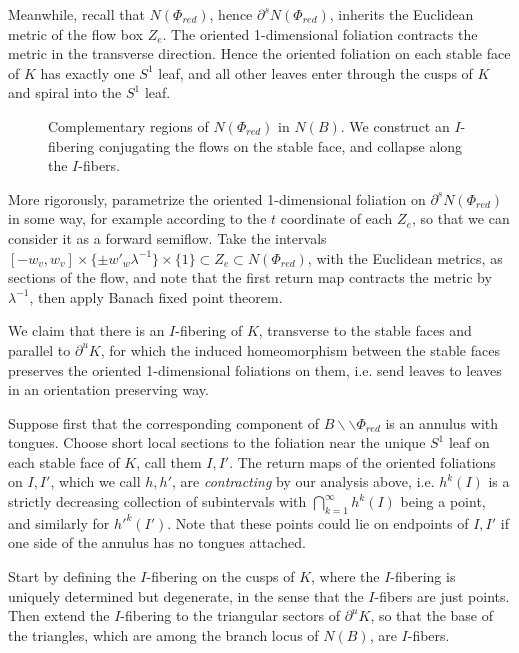 \documentclass[12pt]{amsart}
\theoremstyle{definition}
\numberwithin{equation}{section}
\begin{document}
Meanwhile, recall that $N(\Phi_{red})$, hence $\partial^s N(\Phi_{red})$, inherits the Euclidean metric of the flow box $Z_e$. The oriented 1-dimensional foliation contracts the metric in the transverse direction. Hence the oriented foliation on each stable face of $K$ has exactly one $S^1$ leaf, and all other leaves enter through the cusps of $K$ and spiral into the $S^1$ leaf. 

\begin{figure}
    \centering
    \resizebox{!}{8cm}{}
    \caption{Complementary regions of $N(\Phi_{red})$ in $N(B)$. We construct an $I$-fibering conjugating the flows on the stable face, and collapse along the $I$-fibers.}
    \label{fig:stableglue1}
\end{figure}

More rigorously, parametrize the oriented 1-dimensional foliation on $\partial^s N(\Phi_{red})$ in some way, for example according to the $t$ coordinate of each $Z_e$, so that we can consider it as a forward semiflow. Take the intervals $[-w_v, w_v] \times \{ \pm w'_w \lambda^{-1} \} \times \{ 1 \} \subset Z_e \subset N(\Phi_{red})$, with the Euclidean metrics, as sections of the flow, and note that the first return map contracts the metric by $\lambda^{-1}$, then apply Banach fixed point theorem. 

We claim that there is an $I$-fibering of $K$, transverse to the stable faces and parallel to $\partial^u K$, for which the induced homeomorphism between the stable faces preserves the oriented 1-dimensional foliations on them, i.e. send leaves to leaves in an orientation preserving way. 

Suppose first that the corresponding component of $B \backslash \backslash \Phi_{red}$ is an annulus with tongues. Choose short local sections to the foliation near the unique $S^1$ leaf on each stable face of $K$, call them $I, I'$. The return maps of the oriented foliations on $I, I'$, which we call $h, h'$, are \textit{contracting} by our analysis above, i.e. $h^k(I)$ is a strictly decreasing collection of subintervals with $\bigcap_{k=1}^\infty h^k(I)$ being a point, and similarly for $h'^k(I')$. Note that these points could lie on endpoints of $I,I'$ if one side of the annulus has no tongues attached.

Start by defining the $I$-fibering on the cusps of $K$, where the $I$-fibering is uniquely determined but degenerate, in the sense that the $I$-fibers are just points. Then extend the $I$-fibering to the triangular sectors of $\partial^u K$, so that the base of the triangles, which are among the branch locus of $N(B)$, are $I$-fibers.
\end{document}
